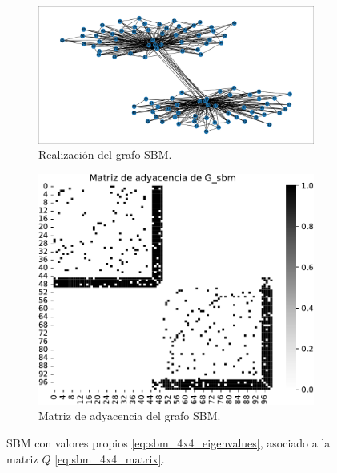 \documentclass{article}
\begin{document}
\begin{figure}[tb]
    \centering
    \begin{subfigure}{0.7\textwidth}
        \centering
        \includegraphics[width=\linewidth]{images/sbm/sbm_4n.pdf}
        \caption{Realización del grafo SBM.}
        \label{fig:sbm_4x4_eigenvalues}
    \end{subfigure}
    \begin{subfigure}{0.6\textwidth}
        \centering
        \includegraphics[width=\linewidth]{images/sbm/sbm_4n_adj_matrix.pdf}
        \caption{Matriz de adyacencia del grafo SBM.}
        \label{fig:sbm_4x4_adj_matrix}
    \end{subfigure}
    \caption{SBM con valores propios \eqref{eq:sbm_4x4_eigenvalues}, asociado a la matriz $Q$ \eqref{eq:sbm_4x4_matrix}.}
    \label{fig:sbm_4x4_generation}
\end{figure}
\end{document}

